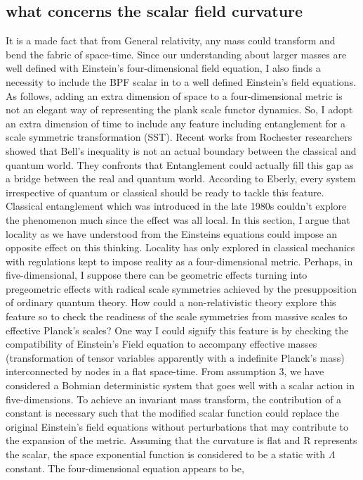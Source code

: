 \documentclass{article}
\begin{document}
\subsection{what concerns the scalar field curvature}
It is a made fact that from General relativity, any mass could transform and bend the fabric of space-time. Since our understanding about larger masses are well defined with Einstein's four-dimensional field equation, I also finds a necessity to include the BPF scalar in to a well defined Einstein's field equations. As follows, adding an extra dimension of space to a four-dimensional metric is not an elegant way of representing the plank scale functor dynamics. So, I adopt an extra dimension of time to include any feature including entanglement for a scale symmetric transformation (SST). Recent works from Rochester researchers showed that Bell's inequality is not an actual boundary between the classical and quantum world. They confronts that Entanglement could actually fill this gap as a bridge between the real and quantum world\cite{18}. According to Eberly, every system irrespective of quantum or classical should be ready to tackle this feature. Classical entanglement which was introduced in the late 1980s couldn't explore the phenomenon much since the effect was all local. In this section, I argue that locality as we have understood from the Einsteins equations could impose an opposite effect on this thinking. Locality has only explored in classical mechanics with regulations kept to impose reality as a four-dimensional metric. Perhaps, in five-dimensional, I suppose there can be geometric effects turning into pregeometric effects with radical scale symmetries achieved by the presupposition of ordinary quantum theory. How could a non-relativistic theory explore this feature so to check the readiness of the scale symmetries from massive scales to effective Planck's scales? One way I could signify this feature is by checking the compatibility of Einstein's Field equation to accompany effective masses (transformation of tensor variables apparently with a indefinite Planck's mass) interconnected by nodes in a flat space-time. \vspace{3mm} \newline
From assumption 3, we have considered a Bohmian deterministic system that goes well with a scalar action in five-dimensions. To achieve an invariant mass transform, the contribution of a constant is necessary such that the modified scalar function could replace the original Einstein's field equations without perturbations that may contribute to the expansion of the metric. Assuming that the curvature is flat and R represents the scalar, the space exponential function is considered to be a static with $\Lambda$ constant. The four-dimensional equation appears to be,
\end{document}
